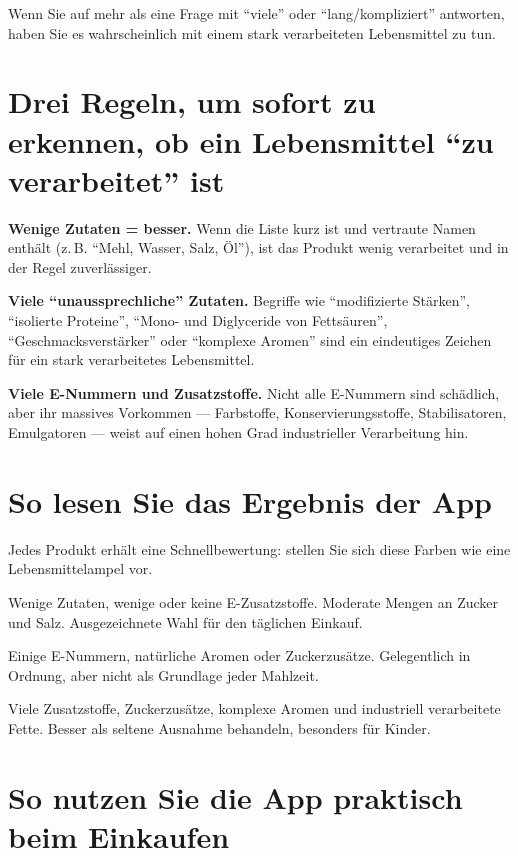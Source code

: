 \documentclass[a5paper,12pt,oneside,openany]{book}
\newcommand{\boxgruen}[2]{%
  \begin{tcolorbox}[kastenbase,
    colback=verdescuro!8!white, colframe=verdescuro, title={#1}]
  #2\end{tcolorbox}}
\newcommand{\boxgelb}[2]{%
  \begin{tcolorbox}[kastenbase,
    colback=gelb!12!white, colframe=gelb!80!black, title={#1}]
  #2\end{tcolorbox}}
\newcommand{\boxrot}[2]{%
  \begin{tcolorbox}[kastenbase,
    colback=rot!8!white, colframe=rot, title={#1}]
  #2\end{tcolorbox}}
\begin{document}
Wenn Sie auf mehr als eine Frage mit ``viele'' oder ``lang/kompliziert''
antworten, haben Sie es wahrscheinlich mit einem stark verarbeiteten
Lebensmittel zu tun.

\section{Drei Regeln, um sofort zu erkennen, ob ein Lebensmittel ``zu
verarbeitet'' ist}

\textbf{Wenige Zutaten = besser.} Wenn die Liste kurz ist und vertraute Namen
enth\"{a}lt (z.\,B. ``Mehl, Wasser, Salz, \"{O}l''), ist das Produkt wenig
verarbeitet und in der Regel zuverl\"{a}ssiger.

\textbf{Viele ``unaussprechliche'' Zutaten.} Begriffe wie ``modifizierte
St\"{a}rken'', ``isolierte Proteine'', ``Mono- und Diglyceride von
Fetts\"{a}uren'', ``Geschmacksverst\"{a}rker'' oder ``komplexe Aromen''
sind ein eindeutiges Zeichen f\"{u}r ein stark verarbeitetes Lebensmittel.

\textbf{Viele E-Nummern und Zusatzstoffe.} Nicht alle E-Nummern sind
sch\"{a}dlich, aber ihr massives Vorkommen --- Farbstoffe, Konservierungsstoffe,
Stabilisatoren, Emulgatoren --- weist auf einen hohen Grad industrieller
Verarbeitung hin.

\section{So lesen Sie das Ergebnis der App}

Jedes Produkt erh\"{a}lt eine Schnellbewertung: stellen Sie sich diese Farben
wie eine Lebensmittelampel vor.

\boxgruen{Wenig verarbeitet --- gr\"{u}nes Licht}{Wenige Zutaten, wenige oder
keine E-Zusatzstoffe. Moderate Mengen an Zucker und Salz. Ausgezeichnete Wahl
f\"{u}r den t\"{a}glichen Einkauf.}

\boxgelb{M\"{a}{\ss}ig verarbeitet --- in Ma{\ss}en verwenden}{Einige E-Nummern,
nat\"{u}rliche Aromen oder Zuckerzus\"{a}tze. Gelegentlich in Ordnung, aber
nicht als Grundlage jeder Mahlzeit.}

\boxrot{Stark verarbeitet --- einschr\"{a}nken oder meiden}{Viele Zusatzstoffe,
Zuckerzus\"{a}tze, komplexe Aromen und industriell verarbeitete Fette. Besser
als seltene Ausnahme behandeln, besonders f\"{u}r Kinder.}

\section{So nutzen Sie die App praktisch beim Einkaufen}
\end{document}
